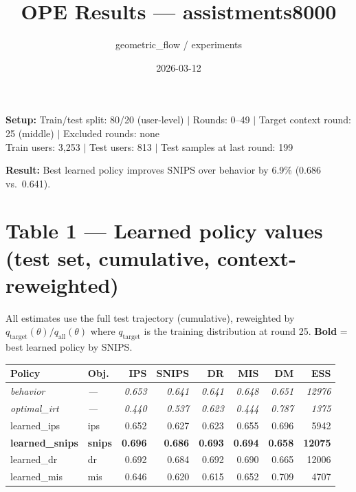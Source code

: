 \documentclass[11pt]{article}
\title{\textbf{OPE Results --- assistments8000}}
\date{2026-03-12}
\author{geometric\_flow / experiments}
\begin{document}
\maketitle

\noindent\textbf{Setup:}
Train/test split: 80/20 (user-level) $|$
Rounds: 0--49 $|$
Target context round: 25 (middle) $|$
Excluded rounds: none\\
Train users: 3{,}253 $|$ Test users: 813 $|$ Test samples at last round: 199

\bigskip
\noindent\colorbox{goodbg}{\parbox{0.97\textwidth}{%
\textbf{Result:} Best learned policy improves SNIPS over behavior by 6.9\% (0.686 vs.\ 0.641).}}

\section*{Table 1 — Learned policy values (test set, cumulative, context-reweighted)}

{\small All estimates use the full test trajectory (cumulative), reweighted by
$q_{\text{target}}(\theta) / q_{\text{all}}(\theta)$ where $q_{\text{target}}$ is the
training distribution at round 25. \textbf{Bold} = best learned policy by SNIPS.}

\bigskip
\begin{tabular}{llrrrrrr}
\toprule
\textbf{Policy} & \textbf{Obj.} & \textbf{IPS} & \textbf{SNIPS} & \textbf{DR} & \textbf{MIS} & \textbf{DM} & \textbf{ESS} \\
\midrule
\rowcolor{behbg}
\textit{behavior} & \textit{---} & \textit{0.653} & \textit{0.641} & \textit{0.641} & \textit{0.648} & \textit{0.651} & \textit{12976} \\
\rowcolor{oraclebg}
\textit{optimal\_irt} & \textit{---} & \textit{0.440} & \textit{0.537} & \textit{0.623} & \textit{0.444} & \textit{0.787} & \textit{1375} \\
learned\_ips & ips & 0.652 & 0.627 & 0.623 & 0.655 & 0.696 & 5942 \\
\textbf{learned\_snips} & \textbf{snips} & \textbf{0.696} & \textbf{0.686} & \textbf{0.693} & \textbf{0.694} & \textbf{0.658} & \textbf{12075} \\
learned\_dr & dr & 0.692 & 0.684 & 0.692 & 0.690 & 0.665 & 12006 \\
learned\_mis & mis & 0.646 & 0.620 & 0.615 & 0.652 & 0.709 & 4707 \\
\bottomrule
\end{tabular}
\end{document}
